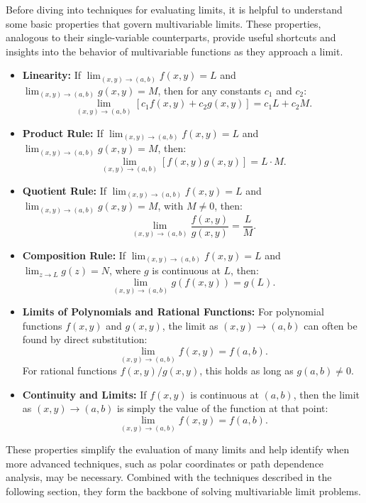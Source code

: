\noindent Before diving into techniques for evaluating limits, it is helpful to understand some basic properties that govern multivariable limits. These properties, analogous to their single-variable counterparts, provide useful shortcuts and insights into the behavior of multivariable functions as they approach a limit.

\begin{itemize}
    \item \textbf{Linearity:} If \( \lim_{(x, y) \to (a, b)} f(x, y) = L \) and \( \lim_{(x, y) \to (a, b)} g(x, y) = M \), then for any constants \( c_1 \) and \( c_2 \):
    \[
    \lim_{(x, y) \to (a, b)} \left[ c_1 f(x, y) + c_2 g(x, y) \right] = c_1 L + c_2 M.
    \]

    \item \textbf{Product Rule:} If \( \lim_{(x, y) \to (a, b)} f(x, y) = L \) and \( \lim_{(x, y) \to (a, b)} g(x, y) = M \), then:
    \[
    \lim_{(x, y) \to (a, b)} \left[ f(x, y) g(x, y) \right] = L \cdot M.
    \]

    \item \textbf{Quotient Rule:} If \( \lim_{(x, y) \to (a, b)} f(x, y) = L \) and \( \lim_{(x, y) \to (a, b)} g(x, y) = M \), with \( M \neq 0 \), then:
    \[
    \lim_{(x, y) \to (a, b)} \frac{f(x, y)}{g(x, y)} = \frac{L}{M}.
    \]

    \item \textbf{Composition Rule:} If \( \lim_{(x, y) \to (a, b)} f(x, y) = L \) and \( \lim_{z \to L} g(z) = N \), where \( g \) is continuous at \( L \), then:
    \[
    \lim_{(x, y) \to (a, b)} g(f(x, y)) = g(L).
    \]

    \item \textbf{Limits of Polynomials and Rational Functions:} For polynomial functions \( f(x, y) \) and \( g(x, y) \), the limit as \( (x, y) \to (a, b) \) can often be found by direct substitution:
    \[
    \lim_{(x, y) \to (a, b)} f(x, y) = f(a, b).
    \]
    For rational functions \( f(x, y)/g(x, y) \), this holds as long as \( g(a, b) \neq 0 \).

    \item \textbf{Continuity and Limits:} If \( f(x, y) \) is continuous at \( (a, b) \), then the limit as \( (x, y) \to (a, b) \) is simply the value of the function at that point:
    \[
    \lim_{(x, y) \to (a, b)} f(x, y) = f(a, b).
    \]
\end{itemize}

\noindent These properties simplify the evaluation of many limits and help identify when more advanced techniques, such as polar coordinates or path dependence analysis, may be necessary. Combined with the techniques described in the following section, they form the backbone of solving multivariable limit problems.

